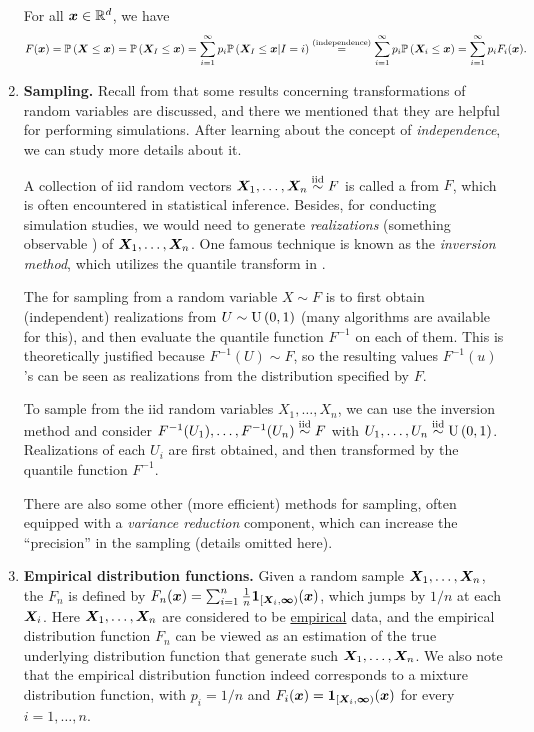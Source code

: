 \begin{enumerate}
\begin{pf}
For all \(\bm{x}\in\mathbb{R}^d\), we have
\[
F(\bm{x})=\mathbb{P}\left(\bm{X}\le\bm{x}\right)
=\mathbb{P}\left(\bm{X}_{I}\le\bm{x}\right)
=\sum_{i=1}^{\infty}p_i\mathbb{P}\left(\bm{X}_{I}\le\bm{x}|I=i\right)
\overset{\text{(independence)}}{=}\sum_{i=1}^{\infty}p_i\mathbb{P}\left(\bm{X}_i\le\bm{x}\right)
=\sum_{i=1}^{\infty}p_iF_i(\bm{x}).
\]
\end{pf}
\item \label{it:sampling} \textbf{Sampling.} Recall from
 that some results concerning transformations of
random variables are discussed, and there we mentioned that they are helpful
for performing simulations. After learning about the concept of
\emph{independence}, we can study more details about it.

A collection of iid random vectors \(\bm{X}_1,\dotsc,\bm{X}_n\overset{\text{iid}}\sim F\) is called a
 from \(F\), which is often encountered in statistical
inference. Besides, for conducting simulation studies, we would need to
generate \emph{realizations} (something observable ) of
\(\bm{X}_1,\dotsc,\bm{X}_n\). One famous technique is known as the \emph{inversion
method}, which utilizes the quantile transform in .

The  for sampling from a random variable \(X\sim F\) is
to first obtain (independent) realizations from \(U\sim \operatorname{U}\left(0,1\right)\) (many
algorithms are available for this), and then evaluate the quantile function
\(F^{-1}\) on each of them. This is theoretically justified because \(F^{-1}(U)\sim F\), 
so the resulting values \(F^{-1}(u)\)'s can be seen as realizations from the
distribution specified by \(F\).

To sample from the iid random variables \(X_1,\dotsc,X_n\), we can use the
inversion method and consider \(F^{-1}(U_1),\dotsc,F^{-1}(U_n)\overset{\text{iid}}\sim F\) with
\(U_1,\dotsc,U_n\overset{\text{iid}}\sim \operatorname{U}\left(0,1\right)\). Realizations of each \(U_i\) are first
obtained, and then transformed by the quantile function \(F^{-1}\).

\begin{note}
There are also some other (more efficient) methods for sampling, often equipped
with a \emph{variance reduction} component, which can increase the ``precision'' in
the sampling (details omitted here).
\end{note}
\item \textbf{Empirical distribution functions.} Given a random sample
\(\bm{X}_1,\dotsc,\bm{X}_n\), the  \(F_n\) is defined by
\(F_n(\bm{x})=\sum_{i=1}^{n}\frac{1}{n}\mathbf{1}_{[\bm{X}_i,\bm{\infty})}(\bm{x})\),
which jumps by \(1/n\) at each \(\bm{X}_i\). Here
\(\bm{X}_1,\dotsc,\bm{X}_n\) are considered to be \underline{empirical} data,
and the empirical distribution function \(F_n\) can be viewed as an
estimation of the true underlying distribution function that generate such
\(\bm{X}_1,\dotsc,\bm{X}_n\). We also note that the empirical distribution
function indeed corresponds to a mixture distribution function, with
\(p_i=1/n\) and \(F_i(\bm{x})=\mathbf{1}_{[\bm{X}_i,\bm{\infty})}(\bm{x})\)
for every \(i=1,\dotsc,n\).


\end{enumerate}
